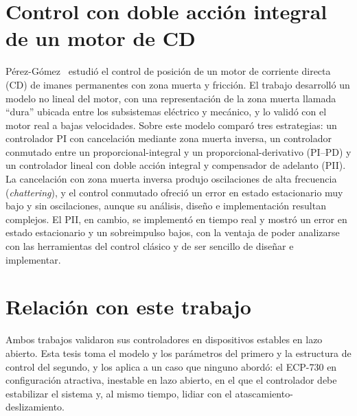 \section{Control con doble acción integral de un motor de CD}

Pérez-Gómez~\cite{perez} estudió el control de posición de un motor de corriente directa (CD) de imanes permanentes con zona muerta y fricción. El trabajo desarrolló un modelo no lineal del motor, con una representación de la zona muerta llamada ``dura'' ubicada entre los subsistemas eléctrico y mecánico, y lo validó con el motor real a bajas velocidades. Sobre este modelo comparó tres estrategias: un controlador PI con cancelación mediante zona muerta inversa, un controlador conmutado entre un proporcional-integral y un proporcional-derivativo (PI--PD) y un controlador lineal con doble acción integral y compensador de adelanto (PII). La cancelación con zona muerta inversa produjo oscilaciones de alta frecuencia (\emph{chattering}), y el control conmutado ofreció un error en estado estacionario muy bajo y sin oscilaciones, aunque su análisis, diseño e implementación resultan complejos. El PII, en cambio, se implementó en tiempo real y mostró un error en estado estacionario y un sobreimpulso bajos, con la ventaja de poder analizarse con las herramientas del control clásico y de ser sencillo de diseñar e implementar.

\section{Relación con este trabajo}

Ambos trabajos validaron sus controladores en dispositivos estables en lazo abierto. Esta tesis toma el modelo y los parámetros del primero y la estructura de control del segundo, y los aplica a un caso que ninguno abordó: el ECP-730 en configuración atractiva, inestable en lazo abierto, en el que el controlador debe estabilizar el sistema y, al mismo tiempo, lidiar con el atascamiento-deslizamiento.
